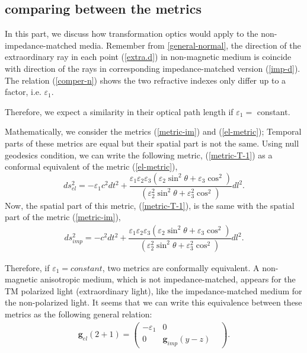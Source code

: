 \documentclass[9pt,twocolumn,twoside]{osajnl}
\begin{document}
\subsection{comparing between the metrics }

In this part, we discuss how transformation optics would apply to the non-impedance-matched media. 
Remember from \ref{general-normal}, the direction of the extraordinary ray in each point (\ref{extra.d}) in non-magnetic medium is coincide with direction of the rays in corresponding impedance-matched  version (\ref{imp-d}).  The relation (\ref{comper-n}) shows the two refractive indexes only differ up to a factor, i.e. $\varepsilon_{1}$. 

Therefore, we expect a similarity in their optical path length if $\varepsilon_{1}=$ constant.

 Mathematically, we consider the metrics (\ref{metric-im}) and (\ref{el-metric}); Temporal parts of these metrics are equal but their spatial part is not the same. Using null geodesics condition, we can write the following metric, (\ref{metric-T-1}) as a conformal equivalent  of the metric (\ref{el-metric}), 
\begin{equation}\label{metric-T-1}
ds_{el}^{2}=- \varepsilon_{1}c^{2}dt^{2}+\dfrac{\varepsilon_{1}\varepsilon_{2}\varepsilon_{3}\left({\varepsilon_{2} \sin^{2}{\theta} + \varepsilon_{3}\cos^{2}}\right)}{\left({\varepsilon_{2}^{2} \sin^{2}{\theta} + \varepsilon_{3}^{2}\cos^{2}}\right)}dl^{2}.
\end{equation}
Now, the spatial part of this metric, (\ref{metric-T-1}), is the same with the spatial part of the metric (\ref{metric-im}),
\begin{align}\label{metric-imp-c}
ds_{imp}^{2}=- c^{2}dt^{2}+\dfrac{\varepsilon_{1}\varepsilon_{2}\varepsilon_{3}\left({\varepsilon_{2} \sin^{2}{\theta} + \varepsilon_{3}\cos^{2}}\right)}{\left({\varepsilon_{2}^{2} \sin^{2}{\theta} + \varepsilon_{3}^{2}\cos^{2}}\right)}dl^{2}.
\end{align}

 Therefore, if $\varepsilon_1=constant$,  two metrics are conformally equivalent. A non-magnetic anisotropic medium, which is  not impedance-matched, appears for the TM polarized light (extraordinary light), like the impedance-matched medium for the non-polarized light. It seems that we can write this equivalence between these metrics as the following general relation:
 \begin{align}
\mathbf{g}_{el}(2+1)=
\begin{pmatrix}
-\varepsilon_{1}&0&\\
0&\mathbf{g}_{imp}(y-z)
\end{pmatrix}.
\end{align}
\end{document}
